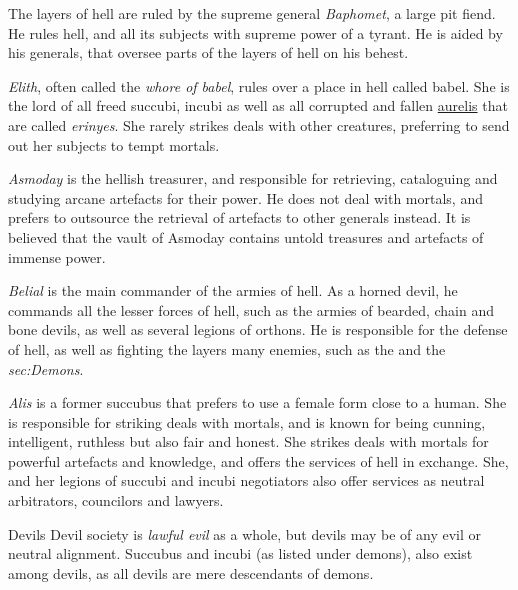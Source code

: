 The layers of hell are ruled by the supreme general \emph{Baphomet}, a large
pit fiend. He rules hell, and all its subjects with supreme power of a
tyrant. He is aided by his generals, that oversee parts of the layers of
hell on his behest.

\emph{Elith}, often called the \emph{whore of babel}, rules over a place in
hell called babel. She is the lord of all freed succubi, incubi as well as all
corrupted and fallen \hyperref[sec:Aurelis]{aurelis} that are called
\emph{erinyes}. She rarely strikes deals with other creatures, preferring to
send out her subjects to tempt mortals.

\emph{Asmoday} is the hellish treasurer, and responsible for retrieving,
cataloguing and studying arcane artefacts for their power. He does not deal
with mortals, and prefers to outsource the retrieval of artefacts to other
generals instead. It is believed that the vault of Asmoday contains untold
treasures and artefacts of immense power.

\emph{Belial} is the main commander of the armies of hell. As a horned devil,
he commands all the lesser forces of hell, such as the armies of bearded,
chain and bone devils, as well as several legions of orthons. He is
responsible for the defense of hell, as well as fighting the layers many
enemies, such as the  and the \emph{sec:Demons}.

\emph{Alis} is a former succubus that prefers to use a female form close to a
human. She is responsible for striking deals with mortals, and is known for
being cunning, intelligent, ruthless but also fair and honest. She strikes
deals with mortals for powerful artefacts and knowledge, and offers the
services of hell in exchange. She, and her legions of succubi and incubi
negotiators also offer services as neutral arbitrators, councilors and
lawyers.

\begin{35e}{Devils}
  Devil society is \emph{lawful evil} as a whole, but devils may be of any
  evil or neutral alignment. Succubus and incubi (as listed under demons),
  also exist among devils, as all devils are mere descendants of demons.
\end{35e}
